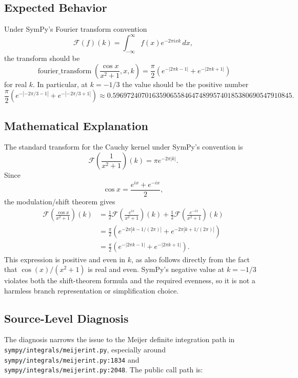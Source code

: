 \documentclass[11pt]{article}
\begin{document}
\subsection{Expected Behavior}

Under SymPy's Fourier transform convention
\[
    \mathcal{F}(f)(k)
    = \int_{-\infty}^{\infty} f(x)e^{-2\pi i x k}\,dx,
\]
the transform should be
\[
    \operatorname{fourier\_transform}\!\left(\frac{\cos x}{x^2+1},x,k\right)
    =
    \frac{\pi}{2}\left(e^{-|2\pi k-1|}+e^{-|2\pi k+1|}\right)
\]
for real \(k\). In particular, at \(k=-1/3\) the value should be the positive
number
\[
    \frac{\pi}{2}\left(e^{-|-2\pi/3-1|}+e^{-|-2\pi/3+1|}\right)
    \approx 0.59697240701635906558464748995740185380690547910845.
\]

\subsection{Mathematical Explanation}

The standard transform for the Cauchy kernel under SymPy's convention is
\[
    \mathcal{F}\!\left(\frac{1}{x^2+1}\right)(k)
    = \pi e^{-2\pi |k|}.
\]
Since
\[
    \cos x = \frac{e^{ix}+e^{-ix}}{2},
\]
the modulation/shift theorem gives
\[
\begin{aligned}
    \mathcal{F}\!\left(\frac{\cos x}{x^2+1}\right)(k)
    &=
    \frac{1}{2}\mathcal{F}\!\left(\frac{e^{ix}}{x^2+1}\right)(k)
    + \frac{1}{2}\mathcal{F}\!\left(\frac{e^{-ix}}{x^2+1}\right)(k) \\
    &=
    \frac{\pi}{2}\left(e^{-2\pi |k-1/(2\pi)|}
        + e^{-2\pi |k+1/(2\pi)|}\right) \\
    &=
    \frac{\pi}{2}\left(e^{-|2\pi k-1|}+e^{-|2\pi k+1|}\right).
\end{aligned}
\]
This expression is positive and even in \(k\), as also follows directly from
the fact that \(\cos(x)/(x^2+1)\) is real and even. SymPy's negative value at
\(k=-1/3\) violates both the shift-theorem formula and the required evenness,
so it is not a harmless branch representation or simplification choice.

\subsection{Source-Level Diagnosis}

The diagnosis narrows the issue to the Meijer definite integration path in
\nolinkurl{sympy/integrals/meijerint.py}, especially around
\nolinkurl{sympy/integrals/meijerint.py:1834} and
\nolinkurl{sympy/integrals/meijerint.py:2048}. The public call path is:
\end{document}
